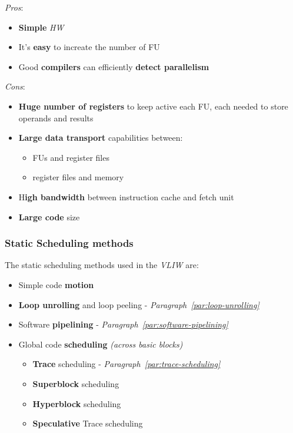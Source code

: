 \documentclass[english]{article}
\begin{document}
\textit{Pros}:
\begin{itemize}[label=\cmarkthin]
  \item \textbf{Simple} \textit{HW}
  \item It's \textbf{easy} to increate the number of FU
  \item Good \textbf{compilers} can efficiently \textbf{detect parallelism}
\end{itemize}

\bigskip
\textit{Cons}:
\begin{itemize}[label=\xmarkthin]
  \item \textbf{Huge number of registers }to keep active each FU, each needed to store operands and results
  \item \textbf{Large data transport} capabilities between:
        \begin{itemize}
          \item FUs and register files
          \item register files and memory
        \end{itemize}
  \item H\textbf{igh bandwidth} between instruction cache and fetch unit
  \item \textbf{Large code} size
\end{itemize}

\subsubsection{Static Scheduling methods}

The static scheduling methods used in the \textit{VLIW} are:

\begin{itemize}
  \item Simple code \textbf{motion}
  \item \textbf{Loop unrolling} and loop peeling - \textit{Paragraph~\ref{par:loop-unrolling}}
  \item Software \textbf{pipelining} - \textit{Paragraph~\ref{par:software-pipelining}}
  \item Global code \textbf{scheduling} \textit{(across basic blocks)}
        \begin{itemize}
          \item \textbf{Trace} scheduling - \textit{Paragraph~\ref{par:trace-scheduling}}
          \item \textbf{Superblock} scheduling
          \item \textbf{Hyperblock} scheduling
          \item \textbf{Speculative} Trace scheduling
        \end{itemize}
\end{itemize}
\end{document}
